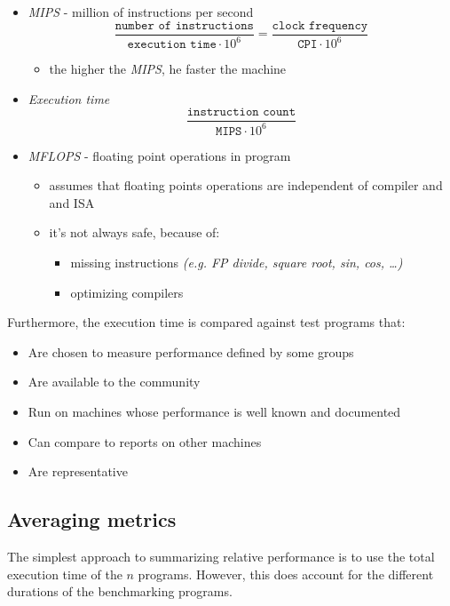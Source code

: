 \documentclass[english]{article}
\begin{document}
\begin{itemize}
  \item \textit{MIPS} - million of instructions per second
        \[ \dfrac{\texttt{number of instructions}}{\texttt{execution time} \cdot 10^6} = \dfrac{\texttt{clock frequency}}{\texttt{CPI} \cdot 10^6} \]
        \begin{itemize}
          \item the higher the \textit{MIPS}, he faster the machine
        \end{itemize}
  \item \textit{Execution time}
        \[ \dfrac{\texttt{instruction count}}{\texttt{MIPS} \cdot 10^6} \]
  \item \textit{MFLOPS} - floating point operations in program
        \begin{itemize}
          \item assumes that floating points operations are independent of compiler and and ISA
          \item it's not always safe, because of:
                \begin{itemize}
                  \item missing instructions \textit{(e.g. FP divide, square root, sin, cos, \dots)}
                  \item optimizing compilers
                \end{itemize}
        \end{itemize}
\end{itemize}

Furthermore, the execution time is compared against test programs that:

\begin{itemize}
  \item Are chosen to measure performance defined by some groups
  \item Are available to the community
  \item Run on machines whose performance is well known and documented
  \item Can compare to reports on other machines
  \item Are representative
\end{itemize}

\subsection{Averaging metrics}

The simplest approach to summarizing relative performance is to use the total execution time of the \(n\) programs.
However, this does account for the different durations of the benchmarking programs.
\end{document}
